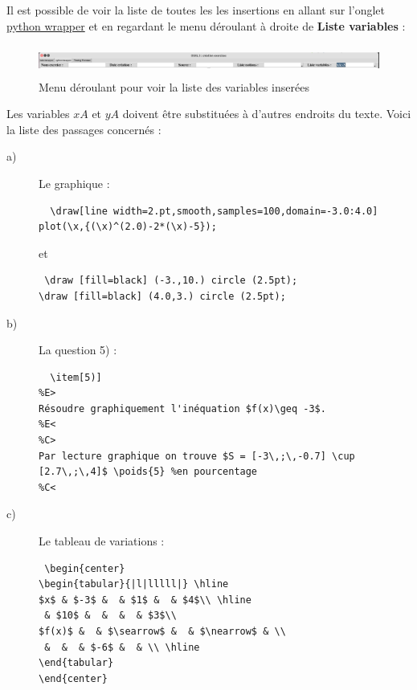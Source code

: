 {\begin{remarque}
 Il est possible de voir la liste de toutes les les insertions en allant sur l'onglet \underline{python wrapper} et en regardant le menu déroulant à droite de {\bf Liste variables} :
 \begin{figure}[h]
 \centering
 \includegraphics[width=18cm,height=1cm]{./images/creation_exercice_var_02.png}
 \caption{Menu déroulant pour voir la liste des variables inserées}
 \label{fig: var 02}
\end{figure}
\end{remarque}

Les variables $xA$ et $yA$ doivent être substituées à d'autres endroits du texte. 
Voici la liste des passages concernés :
\begin{description}
 \item[a)] Le graphique :
 \begin{verbatim}
  \draw[line width=2.pt,smooth,samples=100,domain=-3.0:4.0] plot(\x,{(\x)^(2.0)-2*(\x)-5});
 \end{verbatim}
 et 
 \begin{verbatim}
 \draw [fill=black] (-3.,10.) circle (2.5pt);
\draw [fill=black] (4.0,3.) circle (2.5pt);
 \end{verbatim}
 \item[b)] La question 5) :
 \begin{verbatim}
  \item[5)]  
%E>
Résoudre graphiquement l'inéquation $f(x)\geq -3$.
%E<
%C>
Par lecture graphique on trouve $S = [-3\,;\,-0.7] \cup  [2.7\,;\,4]$ \poids{5} %en pourcentage
%C<
 \end{verbatim}
\item[c)] Le tableau de variations :
\begin{verbatim}
 \begin{center}
\begin{tabular}{|l|lllll|} \hline
$x$ & $-3$ &  & $1$ &  & $4$\\ \hline
 & $10$ &  &  &  & $3$\\ 
$f(x)$ &  & $\searrow$ &  & $\nearrow$ & \\
 &  &  & $-6$ &  & \\ \hline
\end{tabular}
\end{center}
\end{verbatim}


\end{description}}
